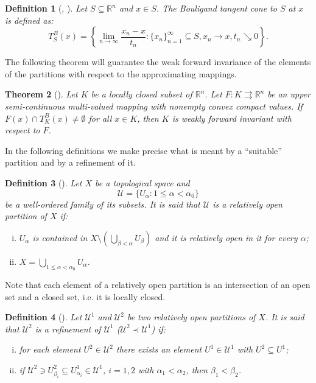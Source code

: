 \documentclass[a4paper]{article}
\newtheorem{thm}{Theorem}[section]
\newtheorem{definition}[thm]{Definition}
\begin{document}
\begin{definition}[\cite{AC}, \cite{CLSW}]
    Let $S \subseteq \mathbb{R}^n$ and $x \in S$. The Bouligand tangent cone to $S$ at $x$ is defined as: $$T^B_S(x) = \left\{\lim_{n \to \infty} \frac{x_n-x}{t_n} : \{x_n\}_{n=1}^{\infty} \subseteq S, x_n \xrightarrow{} x, t_n \searrow 0\right\}.$$
\end{definition}

The following theorem will guarantee the weak forward invariance of the elements of the partitions with respect to the approximating mappings.

\begin{thm}[\cite{AC}]\label{localsol}
    Let $K$ be a locally closed subset of $\mathbb{R}^n$. Let $F: K \rightrightarrows \mathbb{R}^n$ be an upper semi-continuous multi-valued mapping with nonempty convex compact values. If $F(x) \cap T^B_K(x) \ne \emptyset$ for all $x \in K$, then $K$ is weakly forward invariant with respect to $F$.
\end{thm}

In the following definitions we make precise what is meant by a ``suitable'' partition and by a refinement of it.

\begin{definition}[\cite{NR}]
    Let $X$ be a topological space and $$\mathcal{U} = \{U_{\alpha} : 1 \le \alpha < \alpha_0 \}$$ be a well-ordered family of its subsets. It is said that $\mathcal{U}$ is a relatively open partition of $X$ if:
    \begin{enumerate}[(i)]
        \item $U_{\alpha}$ is contained in $X \setminus \left(\bigcup\limits_{\beta < \alpha} U_{\beta}\right)$ and it is relatively open in it for every $\alpha$;
        \item $X = \bigcup\limits_{1 \le \alpha < \alpha_0} U_{\alpha}$.
    \end{enumerate}
\end{definition}

Note that each element of a relatively open partition is an intersection of an open set and a closed set, i.e. it is locally closed.

\begin{definition}[\cite{KR}]
    Let $\mathcal{U}^1$ and $\mathcal{U}^2$ be two relatively open partitions of $X$. It is said that $\mathcal{U}^2$ is a refinement of $\mathcal{U}^1$ ($\mathcal{U}^2 \prec \mathcal{U}^1$) if:
    \begin{enumerate}[(i)]
        \item for each element $U^2 \in \mathcal{U}^2$ there exists an element $U^1 \in \mathcal{U}^1$ with $U^2 \subseteq U^1$;
        \item if $\mathcal{U}^2 \ni U^2_{\beta_i} \subseteq U^1_{\alpha_i} \in \mathcal{U}^1$, $i=1,2$ with $\alpha_1 < \alpha_2$, then $\beta_1 < \beta_2$.
    \end{enumerate}
\end{definition}
\end{document}
